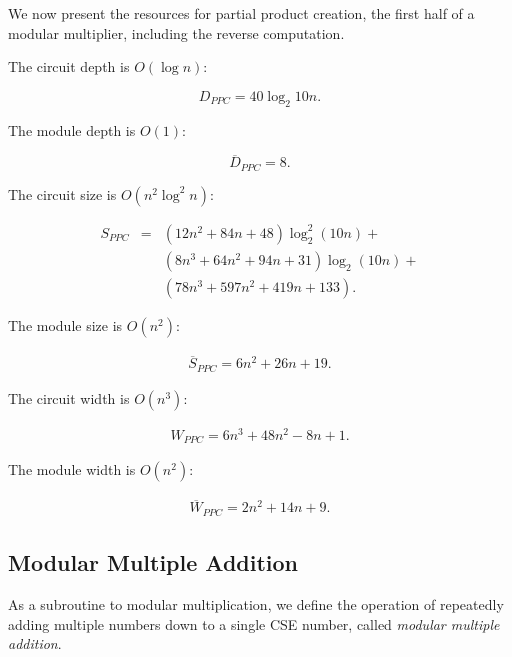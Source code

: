 
We now present the resources for partial product creation, the first half of
a modular multiplier, including the reverse computation.

The circuit depth is $O(\log n)$:

\begin{equation}
D_{PPC} = 40\log_2 10 n\text{.}
\end{equation}

The module depth is $O(1)$:

\begin{equation}
\overline{D}_{PPC} = 8\text{.}
\end{equation}

The circuit size is $O(n^2\log^2 n)$:

\begin{eqnarray}
S_{PPC} & = & (12n^2 + 84n + 48)\log^2_2 (10n) +\\
        &   & (8n^3 + 64n^2 + 94n + 31)\log_2(10n) +\\
        &   & (78n^3 + 597n^2 + 419n + 133)\text{.}
\end{eqnarray}

The module size is $O(n^2)$:

\begin{eqnarray}
\overline{S}_{PPC} = 6n^2 + 26n + 19\text{.}
\end{eqnarray}

The circuit width is $O(n^3)$:

\begin{eqnarray}
W_{PPC} = 6n^3 + 48n^2 - 8n + 1\text{.}
\end{eqnarray}

The module width is $O(n^2)$:

\begin{eqnarray}
\overline{W}_{PPC} = 2n^2 + 14n + 9\text{.}
\end{eqnarray}

\subsection{Modular Multiple Addition}
\label{subsec:mma}

As a subroutine to modular multiplication, we define the operation of
repeatedly adding multiple numbers down to a single CSE number, called
\emph{modular multiple addition}.

